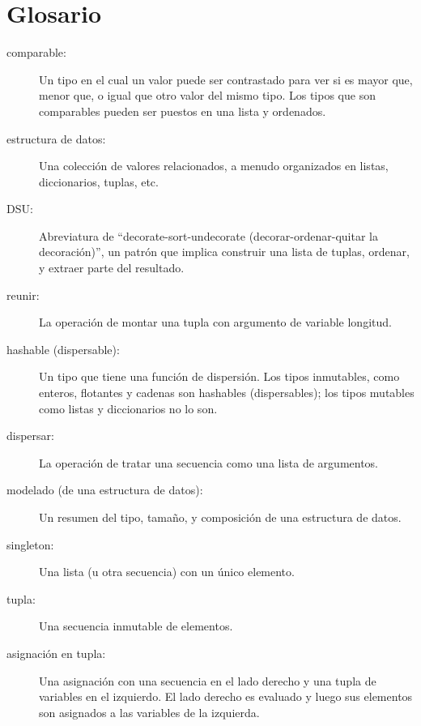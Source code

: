 \section{Glosario}

\begin{description}

\item[comparable:] Un tipo en el cual un valor puede ser contrastado para ver si es
mayor que, menor que, o igual que otro valor del mismo tipo.
Los tipos que son comparables pueden ser puestos en una lista y ordenados.

\item[estructura de datos:] Una colección de valores relacionados, a menudo
organizados en listas, diccionarios, tuplas, etc.

\item[DSU:] Abreviatura de ``decorate-sort-undecorate
(decorar-ordenar-quitar la decoración)'',
un patrón que implica construir una lista de tuplas, ordenar, y
extraer parte del resultado.

\item[reunir:] La operación de montar una tupla
con argumento de variable longitud.

\item[hashable (dispersable):] Un tipo que tiene una función de dispersión. Los tipos
inmutables, como enteros,
flotantes y cadenas son hashables (dispersables); los tipos mutables como listas y
diccionarios no lo son.

\item[dispersar:] La operación de tratar una secuencia como una lista de
argumentos.

\item[modelado (de una estructura de datos):] Un resumen del tipo,
tamaño, y composición de una estructura de datos.

\item[singleton:] Una lista (u otra secuencia) con un único elemento.

\item[tupla:] Una secuencia inmutable de elementos.

\item[asignación en tupla:] Una asignación con una secuencia en el
lado derecho y una tupla de variables en el izquierdo. El lado
derecho es evaluado y luego sus elementos son asignados a las
variables de la izquierda.

\end{description}


